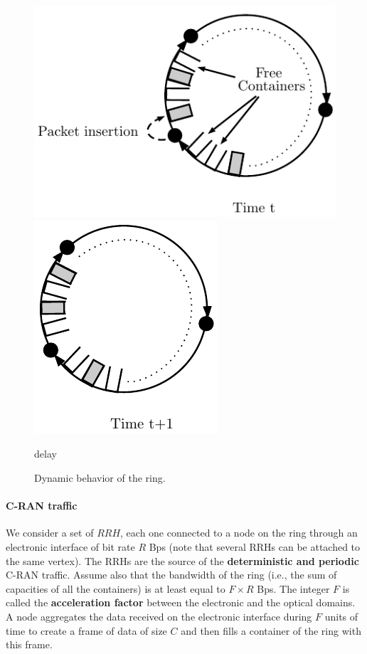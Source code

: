 \documentclass[10pt, conference, letterpaper]{IEEEtran}
\begin{document}
  \begin{figure}[h!]

        \begin{center}
      \hspace{-2.3cm}\includegraphics[scale=0.7]{containers}

   \vspace{0.5cm}

      \includegraphics[scale=0.7]{containers2}
      \end{center}
delay

     \caption{Dynamic behavior of the ring.}\label{fig:containers}

  \end{figure}

     \paragraph{C-RAN traffic}

  We consider a set of $RRH$, each one connected to a node on the ring through an electronic interface of bit rate $R$ Bps (note that several RRHs can be attached to the same vertex). The RRHs are the source of the {\bf deterministic and periodic} C-RAN traffic.
Assume also that the bandwidth of the ring (i.e., the sum of capacities of all the containers) is at least equal to $F\times R$ Bps. The integer $F$ is called the {\bf acceleration factor} between the electronic and the optical domains. A node aggregates the data received on the electronic interface during $F$ units of time to create a  frame of data of size $C$ and then fills a container of the ring with this frame.
\end{document}
